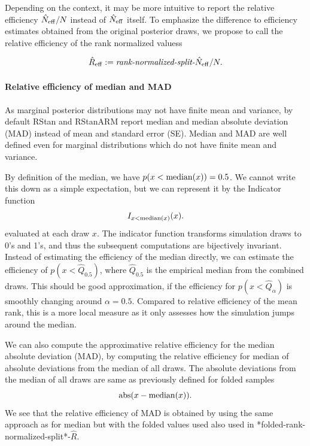 \documentclass[11pt]{article}
\begin{document}
Depending on the context, it may be more intuitive to report the relative 
efficiency $\hat{N}_{\rm eff}/ N$ instead of $\hat{N}_{\rm eff}$ itself.
To emphasize the difference to efficiency estimates obtained from the
original posterior draws,  we propose to call the relative efficiency of 
the rank normalized valuess

\begin{equation}
\label{R_eff}
\hat{R}_{\rm eff} := \text{\it rank-normalized-split-}\hat{N}_{\rm eff}/N.
\end{equation}

\paragraph{Relative efficiency of median and MAD}

As marginal posterior distributions may not have finite mean
and variance, by default RStan and RStanARM report median and median 
absolute deviation (MAD) instead of mean and standard error (SE). 
Median and MAD are well defined even for marginal distributions
which do not have finite mean and variance.

By definition of the median, we have $p(x < {\rm median}(x)) = 0.5$. 
We cannot write this down as a simple expectation, but we can represent 
it by the Indicator function
$$
I_{x<{\rm median}(x)}(x).
$$ 
evaluated at each draw $x$.
The indicator function transforms simulation draws to 0's and 1's, and thus
the subsequent computations are bijectively invariant. Instead of estimating 
the efficiency of the median directly, we can estimate the efficiency of 
$p(x < \hat{Q}_{0.5})$, where $\hat{Q}_{0.5}$ is the empirical median from 
the combined draws. This should be good approximation, if the efficiency for 
$p(x < \hat{Q}_{\alpha})$ is smoothly changing around $\alpha = 0.5$.
Compared to relative efficiency of the mean rank, this is a more local
measure as it only assesses how the simulation jumps around the median.

We can also compute the approximative relative efficiency for the
median absolute deviation (MAD), by computing the relative efficiency
for median of absolute deviations from the median of all draws. The
absolute deviations from the median of all draws are same as
previously defined for folded samples
$$
{\rm abs}(x-{\rm median}(x)).
$$
We see that the relative efficiency of MAD is obtained by using the same
approach as for median but with the folded values used also used in
*folded-rank-normalized-split*-$\widehat{R}$.
\end{document}
